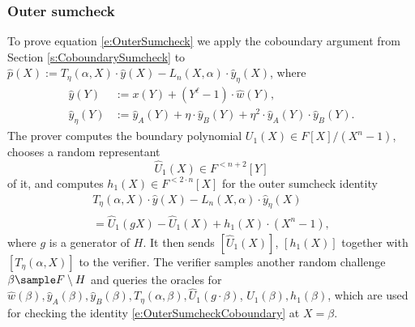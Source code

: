 \documentclass[10pt,article,oneside]{memoir}
\theoremstyle{definition}
\theoremstyle{remark}
\begin{document}
\subsubsection{Outer sumcheck}
To prove equation \eqref{e:OuterSumcheck} we apply the coboundary argument from Section \ref{s:CoboundarySumcheck} to $\hat p(X) := T_\eta(\alpha, X)\cdot \hat y(X) - L_n(X,\alpha) \cdot \hat y_\eta(X)$, where 
\begin{align*}
\hat y(Y) &:= x(Y) + (Y^\ell-1)\cdot \hat w(Y), 
\\
\hat y_\eta(Y) &:=  \hat y_A(Y)+\eta\cdot \hat y_B(Y) + \eta^2\cdot \hat y_A(Y)\cdot \hat y_B(Y).
\end{align*}
The prover computes the boundary polynomial $U_1(X) \in F[X]/(X^n - 1)$, chooses a random representant 
\[
\hat U_1(X)\in  F^{<n+2}[Y]
\]
of it, and computes $h_1(X)\in F^{< 2\cdot n}[X]$ for the outer sumcheck identity
\begin{multline}
\label{e:OuterSumcheckCoboundary}
T_\eta(\alpha,X) \cdot \hat y(X) -  L_n(X,\alpha)\cdot \hat y_\eta(X) 
\\
= \hat U_1(gX) - \hat U_1(X) + h_1(X)\cdot (X^n-1),
\end{multline}
where $g$ is a generator of $H$.
It then sends $[\hat U_1(X)]$, $[h_1(X)]$ together with $[T_\eta(\alpha, X)]$ to the verifier.
The verifier samples another random challenge $\beta\sample F\setminus H$ and queries the oracles for
$\hat w(\beta), \hat y_A(\beta), \hat y_B(\beta), 
T_\eta(\alpha,\beta), \hat U_1(g\cdot \beta)$, $\hat U_1(\beta), h_1(\beta)$,
which are used for checking the identity \eqref{e:OuterSumcheckCoboundary} at $X=\beta$.


\end{document}
